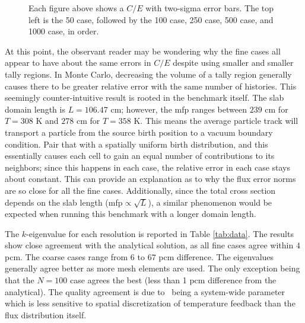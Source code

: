 \documentclass[letterpaper]{mc2023}
\begin{document}
\begin{figure}[H]
\begin{minipage}[b]{0.495\linewidth}
    \end{minipage}
    \caption{Each figure above shows a $C/E$ with two-sigma error bars. The top left is the 50 case, followed by the 100 case, 250 case, 500 case, and 1000 case, in order.}
\label{fig:ce_error_bars}
\end{figure}

At this point, the observant reader may be wondering why the fine cases all appear to have about the same errors in $C/E$ despite using smaller and
smaller tally regions. In Monte Carlo, decreasing the volume of a tally region generally causes there to be greater relative error with the same number
of histories. This seemingly counter-intuitive result is rooted in the benchmark itself. The slab domain length is $L=106.47$ cm; however, the \gls{mfp}
ranges between $239$ cm for $T=308$ K and $278$ cm for $T=358$ K. This means the average particle track will transport a particle from the source birth
position to a vacuum boundary condition. Pair that with a spatially uniform birth distribution, and this essentially causes each cell to gain an equal
number of contributions to its neighbors; since this happens in each case, the relative error in each case stays about constant. This can provide an
explanation as to why the flux error norms are so close for all the fine cases. Additionally, since the total cross section depends on the slab length
(\gls{mfp}$\propto \sqrt{L}$), a similar phenomenon would be expected when running this benchmark with a longer domain length.

The $k$-eigenvalue for each resolution is reported in Table \ref{tab:data}. The results show close agreement with the analytical solution, as all
fine cases agree within $4$ pcm. The coarse cases range from $6$ to $67$ pcm difference. The eigenvalues generally agree better as more mesh elements
are used. The only exception being that the $N=100$ case agrees the best (less than 1 pcm difference from the analytical). The quality agreement is due to
\keff\ being a system-wide parameter which is less sensitive to spatial discretization of temperature feedback than the flux distribution itself.
\end{document}
